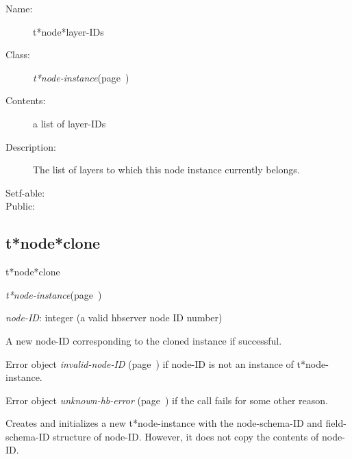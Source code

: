 \begin{description}
\item [Name:]  t*node*layer-IDs

\item [Class:] {\sl t*node-instance}\hfill(page~\pageref{t*node-instance})

\item [Contents:] a list of layer-IDs

\item [Description:]

The list of layers to which this node instance 
currently belongs. 

\item [Setf-able:]


\item [Public:]



\end{description}
\horizontalline

\subsection{t*node*clone}
\label{t*node*clone}

\begin{description}
\item [Name:]  t*node*clone

\item [Class:] {\sl t*node-instance}\hfill(page~\pageref{t*node-instance})

\item [Parameters:]
\item {\sl node-ID}:  
integer (a valid hbserver node ID number)


\item [Return-value:]
A new node-ID corresponding to the cloned instance 
if successful.

Error object {\sl invalid-node-ID} (page~\pageref{invalid-node-ID}) if node-ID is not
an instance of t*node-instance.

Error object {\sl unknown-hb-error} (page~\pageref{unknown-hb-error}) if the call fails
for some other reason. 

\item [Description:]

Creates and initializes a new t*node-instance with 
the node-schema-ID and field-schema-ID structure of 
node-ID. However, it does not copy the contents of 
node-ID.

\item [Public:]



\end{description}
\horizontalline

